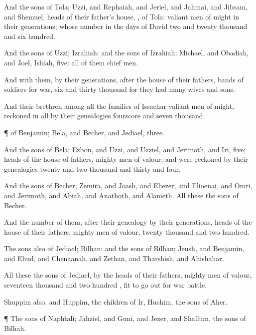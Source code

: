 {And the
sons of
Tola;
Uzzi, and
Rephaiah, and
Jeriel, and
Jahmai, and
Jibsam, and
Shemuel,
heads of their
father’s
house,
{}, of
Tola:
{} valiant
men of
might in their
generations; whose
number
{} in the
days of
David
two and
twenty
thousand and
six
hundred.

And the
sons of
Uzzi;
Izrahiah: and the
sons of
Izrahiah;
Michael, and
Obadiah, and
Joel,
Ishiah,
five: all of them chief
men.

And with them, by their
generations, after the
house of their
fathers,
{}
bands of
soldiers for
war,
six and
thirty
thousand
{} for they had
many
wives and
sons.

And their
brethren among all the
families of
Issachar
{}
valiant men of
might, reckoned in all by their
genealogies
fourscore and
seven
thousand.


\par }{\PP {}¶
{} of
Benjamin;
Bela, and
Becher, and
Jediael,
three.

And the
sons of
Bela;
Ezbon, and
Uzzi, and
Uzziel, and
Jerimoth, and
Iri,
five;
heads of the
house of
{}
fathers,
mighty men of
valour; and were reckoned by their
genealogies
twenty and
two
thousand and
thirty and
four.

And the
sons of
Becher;
Zemira, and
Joash, and
Eliezer, and
Elioenai, and
Omri, and
Jerimoth, and
Abiah, and
Anathoth, and
Alameth. All these
{} the
sons of
Becher.

And the
number of them, after their genealogy by their
generations,
heads of the
house of their
fathers, mighty
men of
valour,
{}
twenty
thousand and two
hundred.

The
sons also of
Jediael;
Bilhan: and the
sons of
Bilhan;
Jeush, and
Benjamin, and
Ehud, and
Chenaanah, and
Zethan, and
Tharshish, and
Ahishahar.

All these the
sons of
Jediael, by the
heads of their
fathers,
mighty men of
valour,
{}
seventeen
thousand and two
hundred
{}, fit to go
out for
war
{}
battle.

Shuppim also, and
Huppim, the
children of
Ir,
{}
Hushim, the
sons of
Aher.


\par }{\PP {}¶ The
sons of
Naphtali;
Jahziel, and
Guni, and
Jezer, and
Shallum, the
sons of
Bilhah.


}
